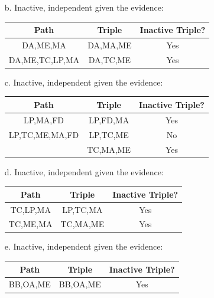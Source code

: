 \documentclass[12pt]{article}
\begin{document}
\begin{enumerate}
\begin{enumerate}
		\item[b.]
		Inactive, independent given the evidence:
		\begin{center}
			\begin{tabular}{|c|c|c|}
				\hline
				Path & Triple & Inactive Triple? \\
				\hline
				DA,ME,MA & DA,MA,ME & Yes \\
				\hline
				DA,ME,TC,LP,MA & DA,TC,ME & Yes \\
				\hline
			\end{tabular}
		\end{center}

		\item[c.]
		Inactive, independent given the evidence:
		\begin{center}
			\begin{tabular}{|c|c|c|}
				\hline
				Path & Triple & Inactive Triple? \\
				\hline
				LP,MA,FD & LP,FD,MA & Yes \\
				\hline
				LP,TC,ME,MA,FD & LP,TC,ME & No \\
				& TC,MA,ME & Yes \\
				\hline
			\end{tabular}
		\end{center}

		\item[d.]
		Inactive, independent given the evidence:
		\begin{center}
			\begin{tabular}{|c|c|c|}
				\hline
				Path & Triple & Inactive Triple? \\
				\hline
				TC,LP,MA & LP,TC,MA & Yes \\
				\hline
				TC,ME,MA & TC,MA,ME & Yes \\
				\hline
			\end{tabular}
		\end{center}

		\item[e.]
		Inactive, independent given the evidence:
		\begin{center}
			\begin{tabular}{|c|c|c|}
				\hline
				Path & Triple & Inactive Triple? \\
				\hline
				BB,OA,ME & BB,OA,ME & Yes \\
				\hline
			\end{tabular}
		\end{center}

	\end{enumerate}


\end{enumerate}
\end{document}
